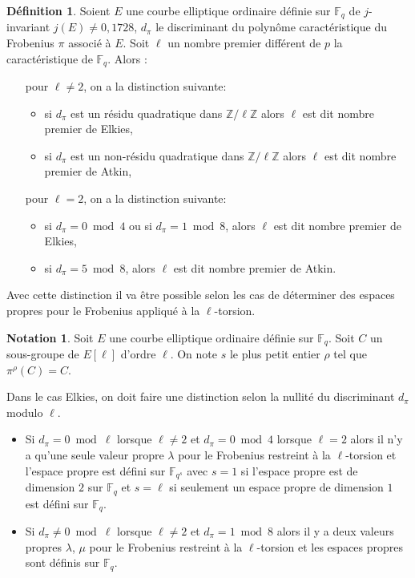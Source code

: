 \documentclass[10pt,a4paper]{book}
\theoremstyle{plain}
\theoremstyle{definition}
\theoremstyle{definition}
\theoremstyle{definition}
\theoremstyle{definition}
\theoremstyle{definition}
\newtheorem{defi}[thm]{Définition}
\theoremstyle{remark}
\theoremstyle{remark}
\theoremstyle{definition}
\newtheorem{nota}[thm]{Notation}
\begin{document}
\begin{defi}\label{def:dif-Atk-Elk}
Soient $E$ une courbe elliptique ordinaire définie sur $\mathbb{F}_q$ de 
$j$-invariant $j(E) \neq 0,1728$, $d_{\pi}$ le discriminant du polynôme 
caractéristique du Frobenius $\pi$ associé à $E$. Soit $\ell$ un nombre premier
différent de $p$ la caractéristique de $\mathbb{F}_q$. Alors :
\begin{itemize}
\item[pour $\ell \neq 2$,] on a la distinction suivante: 

\begin{itemize}
\item si $d_{\pi}$ est un résidu quadratique dans $\mathbb{Z}/\ell \mathbb{Z}$ alors $\ell$ est dit nombre premier de Elkies,
\item si $d_{\pi}$ est un non-résidu quadratique dans $\mathbb{Z}/\ell \mathbb{Z}$ alors $\ell$ est dit nombre premier de Atkin,
\end{itemize} 

\item[pour $\ell=2$,] on a la distinction suivante:
\begin{itemize}
\item si $d_{\pi}= 0 \bmod 4$ ou si $d_{\pi}= 1 \bmod 8$, alors $\ell$ est dit nombre premier de Elkies,
\item si $d_{\pi}= 5 \bmod 8$, alors $\ell$ est dit nombre premier de Atkin.
\end{itemize}
\end{itemize}
\end{defi}
	Avec cette distinction il va être possible selon les cas de déterminer des espaces propres pour le Frobenius appliqué à la $\ell$-torsion.
\begin{nota}
Soit $E$ une courbe elliptique ordinaire définie sur $\mathbb{F}_q$. Soit $C$ un sous-groupe de $E[\ell]$ d'ordre $\ell$. On note $s$ le plus petit entier $\rho$ tel que $\pi^{\rho}(C)=C$.
\end{nota}	
	 
	Dans le cas Elkies, on doit faire une distinction selon la nullité du discriminant $d_{\pi}$ modulo $\ell$. 
\begin{itemize}	
	\item Si $d_{\pi}=0 \bmod \ell$ lorsque $\ell \neq 2$ et $d_{\pi}=0 \bmod 4$ lorsque $\ell=2$  alors il n'y a qu'une seule valeur propre $\lambda$ pour le Frobenius restreint à la $\ell$-torsion  et l'espace propre est défini sur $\mathbb{F}_{q^s}$ avec $s=1$ si l'espace propre est de dimension $2$ sur $\mathbb{F}_q$ et $s=\ell$ si seulement un espace propre de dimension $1$ est défini sur $\mathbb{F}_q$.
	\item Si $d_{\pi} \neq 0 \bmod \ell$ lorsque $\ell \neq 2$ et $d_{\pi}=1 \bmod 8$ alors il y a deux valeurs propres $\lambda$, $\mu$ pour le Frobenius restreint à la $\ell$-torsion  et les espaces propres sont définis sur $\mathbb{F}_q$.
\end{itemize}
\end{document}
